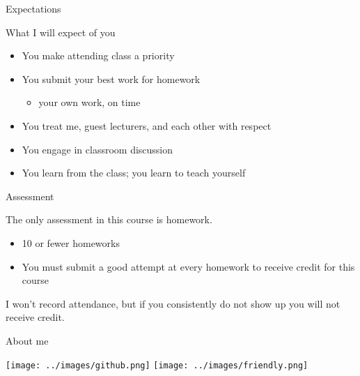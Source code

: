 \documentclass[ignorenonframetext,]{beamer}
\providecommand{\tightlist}{%
  \setlength{\itemsep}{0pt}\setlength{\parskip}{0pt}}
\begin{document}
\begin{frame}{Expectations}
\protect\hypertarget{expectations-1}{}

What I will expect of you

\begin{itemize}
\tightlist
\item
  You make attending class a priority
\item
  You submit your best work for homework

  \begin{itemize}
  \tightlist
  \item
    your own work, on time
  \end{itemize}
\item
  You treat me, guest lecturers, and each other with respect
\item
  You engage in classroom discussion
\item
  You learn from the class; you learn to teach yourself
\end{itemize}

\end{frame}

\begin{frame}{Assessment}
\protect\hypertarget{assessment}{}

The only assessment in this course is homework.

\begin{itemize}
\tightlist
\item
  10 or fewer homeworks
\item
  You must submit a good attempt at every homework to receive credit for
  this course
\end{itemize}

I won't record attendance, but if you consistently do not show up you
will not receive credit.

\end{frame}

\begin{frame}{About me}
\protect\hypertarget{about-me}{}

\texttt{[image: ../images/github.png]}
\texttt{[image: ../images/friendly.png]}

\end{frame}
\end{document}
